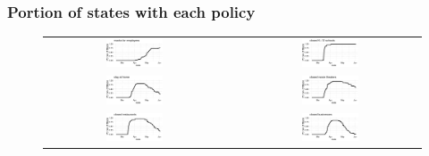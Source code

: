 \documentclass{beamer}
\begin{document}
\begin{frame}
  \frametitle{Portion of states with each
    policy}\vspace{-0.05cm}

\begin{figure}[ht]%
  \begin{minipage}{1.3\linewidth}
    \begin{tabular}{ccc}
      \includegraphics[width=0.33\textwidth]{pmaskbus_p}
      & \quad&
        \includegraphics[width=0.33\textwidth]{pk12_p}\\
        \includegraphics[width=0.33\textwidth]{pshelter_p}& \quad&
      \includegraphics[width=0.33\textwidth]{pmovie_p}\\
        \includegraphics[width=0.33\textwidth]{prestaurant_p}
      & \quad&
        \includegraphics[width=0.33\textwidth]{pnonessential_p}
    \end{tabular}
  \end{minipage}
\end{figure}

 
\end{frame}
\end{document}
